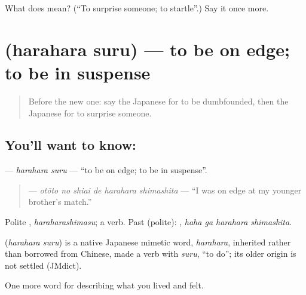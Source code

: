 \begin{tcolorbox}[breakable,colback=teal!4,colframe=teal!35!black,title={Before you move on}]
What does  mean? (\textquotedblleft{}To surprise someone; to startle\textquotedblright{}.) Say it once more.
\end{tcolorbox}
\section[\texorpdfstring{\ja{はらはらする} (harahara suru)}{はらはらする (harahara suru)}]{ (harahara suru) — to be on edge; to be in suspense}

\label{lesson:JA-C431-harahara-suru}



\begin{quote}
Before the new one: say the Japanese for to be dumbfounded, then the Japanese for to surprise someone.
\end{quote}

\subsection*{You'll want to know: }
\textbf{} — \emph{harahara suru} — \textquotedblleft{}to be on edge; to be in suspense\textquotedblright{}.

\begin{quote}
\textbf{  } — \emph{otōto no shiai de harahara shimashita} — \textquotedblleft{}I was on edge at my younger brother's match.\textquotedblright{}
\end{quote}

Polite \textbf{}, \emph{haraharashimasu}; a  verb. Past (polite): \textbf{ }, \emph{haha ga harahara shimashita}.

\begin{cousinweb}
\textbf{} (\emph{harahara suru}) is a native Japanese mimetic word, \emph{harahara}, inherited rather than borrowed from Chinese, made a verb with \emph{suru}, \textquotedblleft{}to do\textquotedblright{}; its older origin is not settled (JMdict).
\end{cousinweb}

\begin{grammarlens}[title={What you've built}]
One more word for describing what you lived and felt.
\end{grammarlens}

